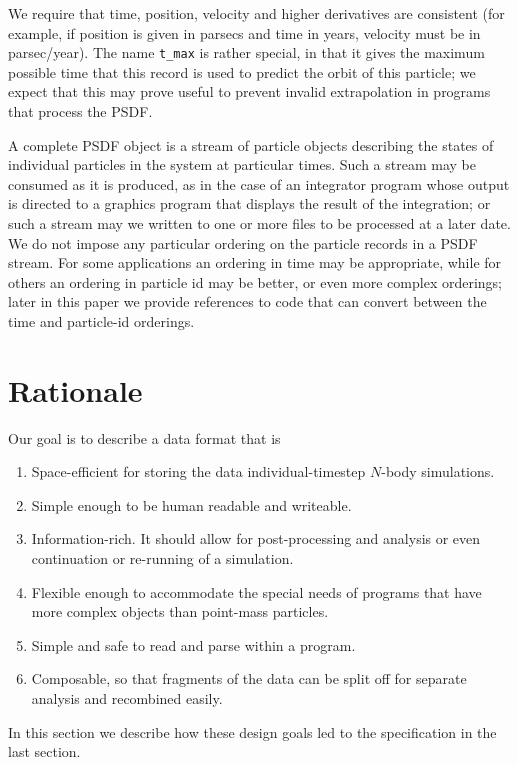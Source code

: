 \documentclass[5p,authoryear]{elsarticle}
\begin{document}
We require that time, position, velocity and higher derivatives are
consistent (for example, if position is given in parsecs and time in
years, velocity must be in parsec/year).  The name {\tt t\_max} is
rather special, in that it gives the maximum possible time that this
record is used to predict the orbit of this particle; we expect that
this may prove useful to prevent invalid extrapolation in programs
that process the PSDF.



A complete PSDF object is a stream of particle objects describing the
states of individual particles in the system at particular times.
Such a stream may be consumed as it is produced, as in the case of an
integrator program whose output is directed to a graphics program that
displays the result of the integration; or such a stream may we
written to one or more files to be processed at a later date.  We do
not impose any particular ordering on the particle records in a PSDF
stream.  For some applications an ordering in time may be appropriate,
while for others an ordering in particle id may be better, or even
more complex orderings; later in this paper we provide references to
code that can convert between the time and particle-id orderings.

\section{Rationale}

Our goal is to describe a data format that is 
\begin{enumerate}
\item Space-efficient for storing the data individual-timestep
  $N$-body simulations.
\item Simple enough to be human readable and writeable.
\item Information-rich.  It should allow for post-processing and
  analysis or even continuation or re-running of a simulation.
\item Flexible enough to accommodate the special needs of programs
  that have more complex objects than point-mass particles.
\item Simple and safe to read and parse within a program.
\item Composable, so that fragments of the data can be split off for
  separate analysis and recombined easily.
\end{enumerate}
In this section we describe how these design goals led to the
specification in the last section.
\end{document}
